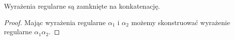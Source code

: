 \begin{theorem}
Wyrażenia regularne są zamknięte na konkatenację.
\end{theorem}

\begin{proof}
 Mając wyrażenia regularne \(\alpha_1\) i \(\alpha_2\) możemy skonstruować wyrażenie regularne \( \alpha_1 \alpha_2 \). 
\end{proof}
